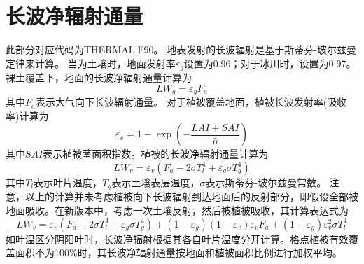 \section{长波净辐射通量}\label{长波净辐射通量}
此部分对应代码为THERMAL.F90。
地表发射的长波辐射是基于斯蒂芬-玻尔兹曼定律来计算。
当为土壤时，地面发射率$\varepsilon_g$设置为0.96；对于冰川时，设置为0.97。
裸土覆盖下，地面的长波净辐射通量计算为
\begin{equation}
L W_{g}=\varepsilon_{g} F_{a}
\end{equation}
其中$F_a$表示大气向下长波辐射通量。
对于植被覆盖地面，植被长波发射率(吸收率)计算为
\begin{equation}
\varepsilon_{v}=1-\exp \left(-\frac{LAI+SAI}{\bar{\mu}}\right)
\end{equation}
其中$SAI$表示植被茎面积指数。植被的长波净辐射通量计算为
\begin{equation}
L W_{v}=\varepsilon_{v}\left(F_{a}-2 \sigma T_{l}^{4}+\varepsilon_{g} \sigma T_{g}^{4}\right)
\end{equation}
其中$T_l$表示叶片温度，$T_g$表示土壤表层温度，$\sigma$表示斯蒂芬-玻尔兹曼常数。
注意，以上的计算并未考虑植被向下长波辐射到达地面后的反射部分，即假设全部被地面吸收。在新版本中，考虑一次土壤反射，然后被植被吸收，其计算表达式为
\begin{equation}
L W_{v}=\varepsilon_{v}\left(F_{a}-2 \sigma T_{l}^{4}+\varepsilon_{g} \sigma T_{g}^{4}\right)+\left(1-\varepsilon_{g}\right)\left(1-\varepsilon_{v}\right) \varepsilon_{v} F_{a}+\left(1-\varepsilon_{g}\right) \varepsilon_{v}^{2} \sigma T_{l}^{4}
\end{equation}
如叶温区分阴阳叶时，长波净辐射根据其各自叶片温度分开计算。格点植被有效覆盖面积不为100\%时，其长波净辐射通量按地面和植被面积比例进行加权平均。


